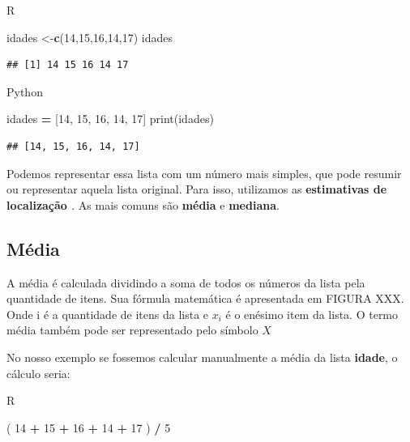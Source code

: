 \documentclass[
]{book}
\newenvironment{Shaded}{\begin{snugshade}}{\end{snugshade}}
\newcommand{\BuiltInTok}[1]{#1}
\newcommand{\DecValTok}[1]{\textcolor[rgb]{0.00,0.00,0.81}{#1}}
\newcommand{\FunctionTok}[1]{\textcolor[rgb]{0.13,0.29,0.53}{\textbf{#1}}}
\newcommand{\NormalTok}[1]{#1}
\newcommand{\OperatorTok}[1]{\textcolor[rgb]{0.81,0.36,0.00}{\textbf{#1}}}
\newcommand{\OtherTok}[1]{\textcolor[rgb]{0.56,0.35,0.01}{#1}}
\newcommand{\SpecialCharTok}[1]{\textcolor[rgb]{0.81,0.36,0.00}{\textbf{#1}}}
\begin{document}
R

\begin{Shaded}
\begin{Highlighting}[]
\NormalTok{idades }\OtherTok{\textless{}{-}}\FunctionTok{c}\NormalTok{(}\DecValTok{14}\NormalTok{,}\DecValTok{15}\NormalTok{,}\DecValTok{16}\NormalTok{,}\DecValTok{14}\NormalTok{,}\DecValTok{17}\NormalTok{)}
\NormalTok{idades}
\end{Highlighting}
\end{Shaded}

\begin{verbatim}
## [1] 14 15 16 14 17
\end{verbatim}

Python

\begin{Shaded}
\begin{Highlighting}[]
\NormalTok{idades }\OperatorTok{=}\NormalTok{ [}\DecValTok{14}\NormalTok{, }\DecValTok{15}\NormalTok{, }\DecValTok{16}\NormalTok{, }\DecValTok{14}\NormalTok{, }\DecValTok{17}\NormalTok{]}
\BuiltInTok{print}\NormalTok{(idades)}
\end{Highlighting}
\end{Shaded}

\begin{verbatim}
## [14, 15, 16, 14, 17]
\end{verbatim}

Podemos representar essa lista com um número mais simples, que pode resumir ou representar aquela lista original. Para isso, utilizamos as \textbf{estimativas de localização \citep{bruce2020practical}}. As mais comuns são \textbf{média} e \textbf{mediana}.

\hypertarget{muxe9dia}{%
\subsection{Média}\label{muxe9dia}}

A média é calculada dividindo a soma de todos os números da lista pela quantidade de itens. Sua fórmula matemática é apresentada em FIGURA XXX. Onde i é a quantidade de itens da lista e \(x_i\) é o enésimo item da lista. O termo média também pode ser representado pelo símbolo \(X\)

No nosso exemplo se fossemos calcular manualmente a média da lista \textbf{idade}, o cálculo seria:

R

\begin{Shaded}
\begin{Highlighting}[]
\NormalTok{( }\DecValTok{14} \SpecialCharTok{+} \DecValTok{15} \SpecialCharTok{+} \DecValTok{16} \SpecialCharTok{+} \DecValTok{14} \SpecialCharTok{+} \DecValTok{17}\NormalTok{ ) }\SpecialCharTok{/} \DecValTok{5}
\end{Highlighting}
\end{Shaded}
\end{document}
